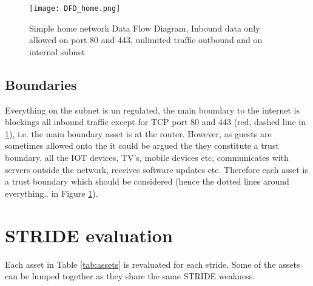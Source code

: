 \documentclass[
	letterpaper, %
	10pt, %
	unnumberedsections, %
	twoside, %
]{APAAssignment}
\begin{document}
\begin{figure}[!htp] %
	\centering
	\texttt{[image: DFD\_home.png]}
	\caption{Simple home network Data Flow Diagram, Inbound data only allowed on port 80 and 443, unlimited traffic outbound and on internal subnet}
	\label{fig:DFD}
\end{figure}


\subsection{Boundaries}
Everything on the subnet is un regulated, the main boundary to the internet is blockings all inbound traffic except for TCP port 80 and 443 (red, dashed line in \ref{fig:DFD}), i.e. the main boundary asset is at the router. However, as guests are sometimes allowed onto the it could be argued the they constitute a trust boundary, all the IOT devices, TV's, mobile devices etc, communicates with servers outside the network, receives software updates etc. Therefore each asset is a trust boundary which should be considered (hence the dotted lines around everything.. in Figure \ref{fig:DFD}). 


\section{STRIDE evaluation}
Each asset in Table \ref{tab:assets} is revaluated for each stride. Some of the assets can be lumped together as they share the same STRIDE weakness. 
\end{document}
